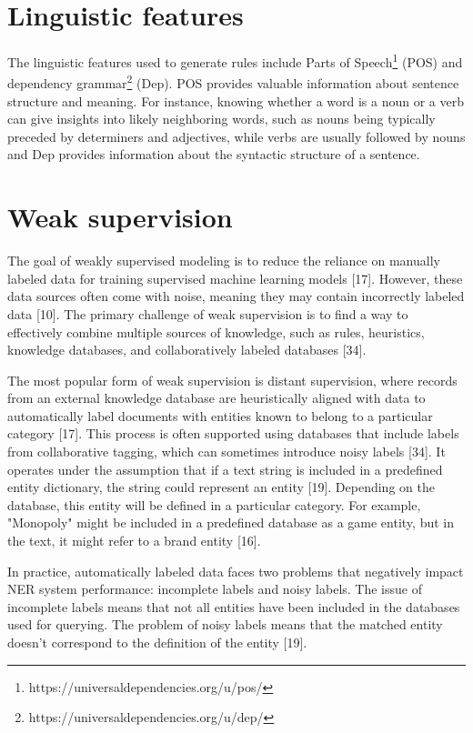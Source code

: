 \section{Linguistic features}

The linguistic features used to generate rules include Parts of Speech\footnote{https://universaldependencies.org/u/pos/} (POS) and dependency grammar\footnote{https://universaldependencies.org/u/dep/} (Dep). POS provides valuable information about sentence structure and meaning. For instance, knowing whether a word is a noun or a verb can give insights into likely neighboring words, such as nouns being typically preceded by determiners and adjectives, while verbs are usually followed by nouns \cite{martin-2020-speech} and Dep provides information about the syntactic structure of a sentence\cite{martin-2020-speech}.


\section{Weak supervision}

The goal of weakly supervised modeling is to reduce the reliance on manually labeled data for training supervised machine learning models [17]. However, these data sources often come with noise, meaning they may contain incorrectly labeled data [10]. The primary challenge of weak supervision is to find a way to effectively combine multiple sources of knowledge, such as rules, heuristics, knowledge databases, and collaboratively labeled databases [34].

The most popular form of weak supervision is distant supervision, where records from an external knowledge database are heuristically aligned with data to automatically label documents with entities known to belong to a particular category [17]. This process is often supported using databases that include labels from collaborative tagging, which can sometimes introduce noisy labels [34]. It operates under the assumption that if a text string is included in a predefined entity dictionary, the string could represent an entity [19]. Depending on the database, this entity will be defined in a particular category. For example, "Monopoly" might be included in a predefined database as a game entity, but in the text, it might refer to a brand entity [16].


In practice, automatically labeled data faces two problems that negatively impact NER system performance: incomplete labels and noisy labels. The issue of incomplete labels means that not all entities have been included in the databases used for querying. The problem of noisy labels means that the matched entity doesn't correspond to the definition of the entity [19].

